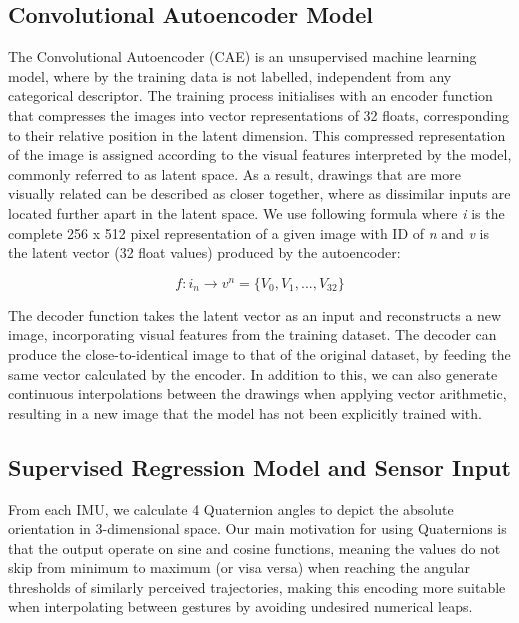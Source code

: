 \subsection*{Convolutional Autoencoder Model}

The Convolutional Autoencoder (CAE) is an unsupervised machine learning model, where by the training data is not labelled, independent from any categorical descriptor. The training process initialises with an encoder function that compresses the images into vector representations of 32 floats, corresponding to their relative position in the latent dimension. This compressed representation of the image is assigned according to the visual features interpreted by the model, commonly referred to as latent space. As a result, drawings that are more visually related can be described as closer together, where as dissimilar inputs are located further apart in the latent space. We use following formula where \textit{i} is the complete 256 x 512 pixel representation of a given image with ID of \textit{n} and \textit{v} is the latent vector (32 float values) produced by the autoencoder:

\[ f:i_n\xrightarrow{}v^n = \{V_0, V_1,... ,V_{32}\} \]

The decoder function takes the latent vector as an input and reconstructs a new image, incorporating visual features from the training dataset. The decoder can produce the close-to-identical image to that of the original dataset, by feeding the same vector calculated by the encoder. In addition to this, we can also generate continuous interpolations between the drawings when applying vector arithmetic, resulting in a new image that the model has not been explicitly trained with.

\subsection*{Supervised Regression Model and Sensor Input}
\label{sensor_input}

From each IMU, we calculate 4 Quaternion angles to depict the absolute orientation in 3-dimensional space. Our main motivation for using Quaternions is that the output operate on sine and cosine functions, meaning the values do not skip from minimum to maximum (or visa versa) when reaching the angular thresholds of similarly perceived trajectories, making this encoding more suitable when interpolating between gestures by avoiding undesired numerical leaps.

